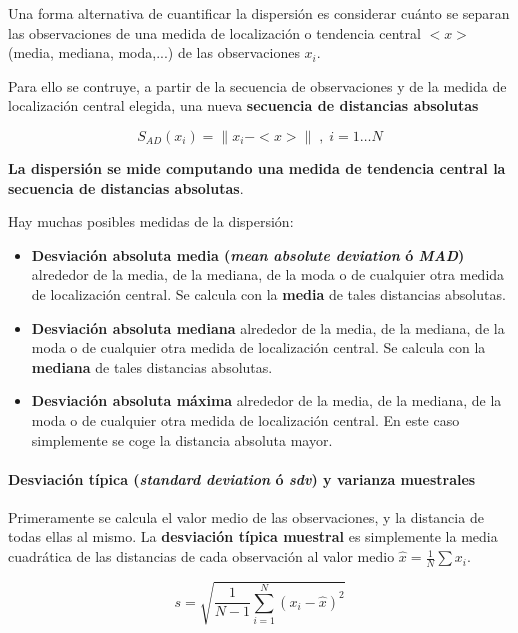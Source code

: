 \documentclass[11pt]{article}
\providecommand{\tightlist}{%
      \setlength{\itemsep}{0pt}\setlength{\parskip}{0pt}}
\begin{document}
    Una forma alternativa de cuantificar la dispersión es considerar cuánto
se separan las observaciones de una medida de localización o tendencia
central \(<x>\) (media, mediana, moda,...) de las observaciones \(x_i\).

Para ello se contruye, a partir de la secuencia de observaciones y de la
medida de localización central elegida, una nueva \textbf{secuencia de
distancias absolutas}

\[ S_{AD}(x_i) = \|x_i - <x>\| \; , \; i = 1 \ldots N\]

\textbf{La dispersión se mide computando una medida de tendencia central
la secuencia de distancias absolutas}.

    Hay muchas posibles medidas de la dispersión:

\begin{itemize}
\tightlist
\item
  \textbf{Desviación absoluta media (\emph{mean absolute deviation} ó
  \emph{MAD})} alrededor de la media, de la mediana, de la moda o de
  cualquier otra medida de localización central. Se calcula con la
  \textbf{media} de tales distancias absolutas.
\item
  \textbf{Desviación absoluta mediana} alrededor de la media, de la
  mediana, de la moda o de cualquier otra medida de localización
  central. Se calcula con la \textbf{mediana} de tales distancias
  absolutas.
\item
  \textbf{Desviación absoluta máxima} alrededor de la media, de la
  mediana, de la moda o de cualquier otra medida de localización
  central. En este caso simplemente se coge la distancia absoluta mayor.
\end{itemize}

    \paragraph{\texorpdfstring{Desviación típica (\emph{standard deviation}
ó \emph{sdv}) y varianza
muestrales}{Desviación típica (standard deviation ó sdv) y varianza muestrales}}\label{desviaciuxf3n-tuxedpica-standard-deviation-uxf3-sdv-y-varianza-muestrales}

Primeramente se calcula el valor medio de las observaciones, y la
distancia de todas ellas al mismo. La \textbf{desviación típica
muestral} es simplemente la media cuadrática de las distancias de cada
observación al valor medio \(\hat x = \frac{1}{N}\sum x_i\).

\[ s = \sqrt{\frac{1}{N-1} \sum_{i=1}^N \left(x_i - \hat x\right)^2}\]
\end{document}
